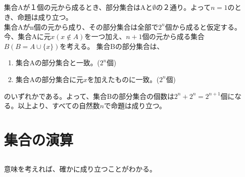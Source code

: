 \documentclass{jsarticle}
\begin{document}
\subsection{}
集合Aが１個の元から成るとき、部分集合はAと$\emptyset$の２通り。よって$n=1$のとき、命題は成り立つ。\\
集合Aがn個の元から成り、その部分集合は全部で$2^n$個から成ると仮定する。
今、集合Aに元$x(x\notin A)$を一つ加え、$n+1$個の元から成る集合$B(B=A\cup\{x\})$を考える。
集合Bの部分集合は、
\begin{enumerate}
\item 集合Aの部分集合と一致。($2^n$個)
\item 集合Aの部分集合に元$x$を加えたものに一致。($2^n$個)
\end{enumerate}
のいずれかである。よって、集合Bの部分集合の個数は$2^n+2^n=2^{n+1}$個になる。以上より、すべての自然数$n$で命題は成り立つ。

\section{集合の演算}

\subsection{}
意味を考えれば、確かに成り立つことがわかる。
\end{document}
